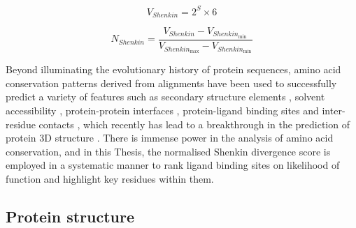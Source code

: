 \vspace{-13pt} %
\vspace{-13pt} %

\begin{equation}
V_{Shenkin} = 2^S \times 6
\label{eq:shenkin}
\end{equation}

\vspace{-13pt} %
\vspace{-6pt} %

\begin{equation}
N_{Shenkin} = \frac{V_{Shenkin} - V_{Shenkin_{\text{min}}}}{V_{Shenkin_{\text{max}}} - V_{Shenkin_{\text{min}}}}
\label{eq:shenkin_norm}
\end{equation}

Beyond illuminating the evolutionary history of protein sequences, amino acid conservation patterns derived from alignments have been used to successfully predict a variety of features such as secondary structure elements \cite{ROST_1993_SSPRED}, solvent accessibility \cite{ROST_1994_RSAPRED}, protein-protein interfaces \cite{LICHTARGE_1996_PPIs}, protein-ligand binding sites \cite{GLASER_2006_PREDICTION} and inter-residue contacts \cite{MARKS_2011_CONS}, which recently has lead to a breakthrough in the prediction of protein 3D structure \cite{JUMPER_2021_ALPHAFOLD}. There is immense power in the analysis of amino acid conservation, and in this Thesis, the normalised Shenkin divergence score is employed in a systematic manner to rank ligand binding sites on likelihood of function and highlight key residues within them. 

\subsection{Protein structure}

